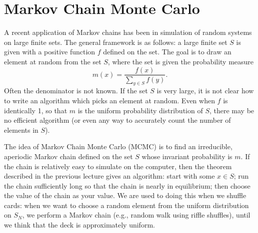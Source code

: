 \documentclass{stml-l}
\theoremstyle{definition}
\numberwithin{equation}{chapter}
\numberwithin{figure}{chapter}
\numberwithin{figure}{section}
\begin{document}

\chapter{Markov Chain Monte Carlo\label{ch08:chap08}}

A recent application of Markov chains has been in simulation of
random systems on large finite sets. The general framework is as
follows: a large finite set $S$ is given with a positive function
$f$ defined on the set. The goal is to draw an element at random
from the set $S$, where the set is given the probability measure
\begin{equation*}
m(x)=\frac{f(x)}{\sum\nolimits_{y\in S}f(y)}.
\end{equation*}
Often the denominator is not known. If the set $S$ is very large, it
is not clear how to write an algorithm which picks an element at
random. Even when $f$ is identically 1, so that $m$ is the uniform
probability distribution of $S$, there may be no efficient algorithm
(or even any way to accurately count the number of elements in $S$).

The idea of Markov Chain Monte Carlo (MCMC) is to find an
irreducible, aperiodic Markov chain defined on the set $S$ whose
invariant probability is $m$. If the chain is relatively easy to
simulate on the computer, then the theorem described in the previous
lecture gives an algorithm: start with some $x\in S$; run the chain
sufficiently long so that the chain is nearly in equilibrium; then
choose the value of the chain as your value. We are used to doing
this when we shuffle cards: when we want to choose a random element
from the uniform distribution on $S_{N}$, we perform a Markov chain
(e.g., random walk using riffle shuffles), until we think that the
deck is approximately uniform.
\end{document}
